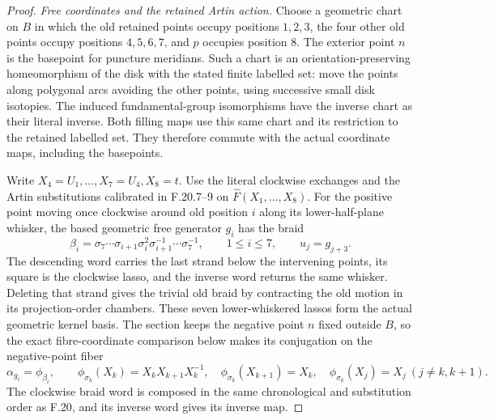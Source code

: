 \begin{proof}
\emph{Free coordinates and the retained Artin action.}
Choose a geometric chart on $B$ in which the old
retained points occupy positions $1,2,3$, the four
other old points occupy positions $4,5,6,7$, and $p$
occupies position $8$. The exterior point $n$ is
the basepoint for puncture meridians. Such a chart
is an orientation-preserving homeomorphism of the
disk with the stated finite labelled set: move
the points along polygonal arcs avoiding the other
points, using successive small disk isotopies.
The induced fundamental-group isomorphisms have
the inverse chart as their literal inverse.
Both filling maps use this same chart and its
restriction to the retained labelled set.
They therefore commute with the actual coordinate
maps, including the basepoints.

Write $X_4=U_1,\ldots,X_7=U_4,X_8=t$.
Use the literal clockwise exchanges and the Artin
substitutions calibrated in F.20.7--9 on
$\widehat F(X_1,\ldots,X_8)$.
For the positive point moving once clockwise around old
position $i$ along its lower-half-plane whisker, the
based geometric free generator $g_i$ has the braid
\[
 \beta_i=\sigma_7\cdots\sigma_{i+1}\sigma_i^2
                  \sigma_{i+1}^{-1}\cdots\sigma_7^{-1},
          \qquad1\leq i\leq7,
 \qquad u_j=g_{j+3}.
                                                               \tag{F.22.11}
\]
The descending word carries the last strand below
the intervening points, its square is the clockwise
lasso, and the inverse word returns the same whisker.
Deleting that strand gives the trivial old braid by
contracting the old motion in its projection-order
chambers. These seven lower-whiskered lassos form the
actual geometric kernel basis. The section keeps the
negative point $n$ fixed outside $B$, so the exact
fibre-coordinate comparison below makes its conjugation
on the negative-point fiber
\[
 \alpha_{g_i}=\phi_{\beta_i},
 \qquad
 \phi_{\sigma_k}(X_k)=X_kX_{k+1}X_k^{-1},
 \quad\phi_{\sigma_k}(X_{k+1})=X_k,
 \quad\phi_{\sigma_k}(X_j)=X_j\ (j\ne k,k+1).
                                                               \tag{F.22.12}
\]
The clockwise braid word is composed in the same
chronological and substitution order as F.20, and its
inverse word gives its inverse map.


\end{proof}
